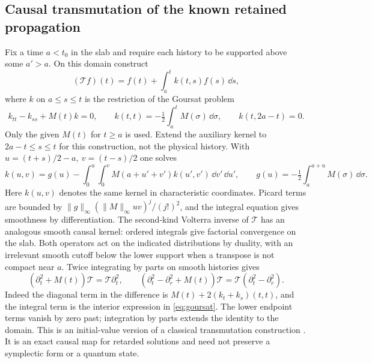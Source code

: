 \subsection{Causal transmutation of the known retained propagation}
Fix a time \(a<t_0\) in the slab and require each history to be supported above some \(a'>a\). On this domain construct
\[
 (\mathcal T f)(t)=f(t)+\int_a^t k(t,s)f(s)\,\dd s,
\]
where \(k\) on \(a\le s\le t\) is the restriction of the Goursat problem
\begin{equation}
 k_{tt}-k_{ss}+M(t)k=0,\qquad
 k(t,t)=-\tfrac12\int_a^t M(\sigma)\,\dd\sigma,\qquad
 k(t,2a-t)=0 .
 \label{eq:goursat}
\end{equation}
Only the given \(M(t)\) for \(t\ge a\) is used. Extend the auxiliary kernel to \(2a-t\le s\le t\) for this construction, not the physical history. With \(u=(t+s)/2-a,\ v=(t-s)/2\) one solves
\[
 k(u,v)=g(u)-\int_0^u\int_0^v
      M(a+u'+v')k(u',v')\,\dd v'\,\dd u',
 \qquad g(u)=-\tfrac12\int_a^{a+u}M(\sigma)\,\dd\sigma .
\]
Here \(k(u,v)\) denotes the same kernel in characteristic coordinates. Picard terms are bounded by \(\|g\|_\infty(\|M\|_\infty uv)^j/(j!)^2\), and the integral equation gives smoothness by differentiation. The second-kind Volterra inverse of \(\mathcal T\) has an analogous smooth causal kernel: ordered integrals give factorial convergence on the slab. Both operators act on the indicated distributions by duality, with an irrelevant smooth cutoff below the lower support when a transpose is not compact near \(a\). Twice integrating by parts on smooth histories gives
\begin{equation}
  (\partial_t^2+M(t))\mathcal T=\mathcal T\partial_t^2 ,
  \qquad (\partial_t^2-\partial_r^2+M(t))\mathcal T
         =\mathcal T(\partial_t^2-\partial_r^2).
 \label{eq:transmute}
\end{equation}
Indeed the diagonal term in the difference is \(M(t)+2(k_t+k_s)(t,t)\), and the integral term is the interior expression in \eqref{eq:goursat}. The lower endpoint terms vanish by zero past; integration by parts extends the identity to the domain. This is an initial-value version of a classical transmutation construction \cite{KMT}. It is an exact causal map for retarded solutions and need not preserve a symplectic form or a quantum state.

